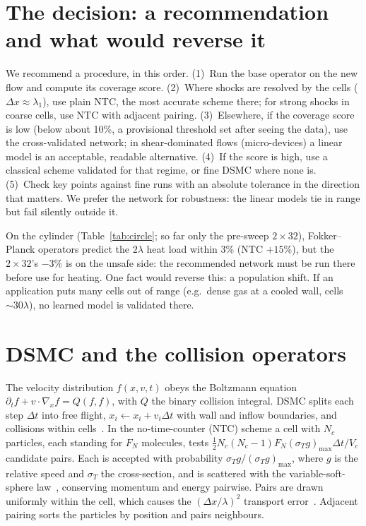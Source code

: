 \documentclass[10pt]{article}
\newcommand{\dx}{\Delta x}
\begin{document}
\section{The decision: a recommendation and what would reverse it}\label{sec:decision}

We recommend a procedure, in this order. (1)~Run the base operator on the new flow and compute
its coverage score. (2)~Where shocks are resolved by the cells
($\dx\approx\lambda_1$), use plain NTC, the most accurate scheme there; for strong shocks in
coarse cells, use NTC with adjacent pairing. (3)~Elsewhere, if the coverage score is low (below
about 10\%, a provisional threshold set after seeing the data), use the cross-validated network;
in shear-dominated flows (micro-devices) a linear model is an acceptable, readable alternative.
(4)~If the score is high, use a classical scheme validated for that regime, or fine DSMC where
none is. (5)~Check key points against fine runs with an absolute tolerance in the direction that
matters. We prefer the network for robustness: the linear models tie in range but fail silently outside it.

On the cylinder (Table~\ref{tab:circle}; so far only the pre-sweep $2\times32$), Fokker--Planck
operators predict the $2\lambda$ heat load within 3\% (NTC $+15\%$), but the $2\times32$'s $-3\%$
is on the unsafe side: the recommended network must be run there before use for heating. One fact would reverse this: a population shift. If an application puts many cells out of range
(e.g.\ dense gas at a cooled wall, cells $\sim30\lambda$), no learned model is validated there.




\clearpage
\appendix

\section{DSMC and the collision operators}\label{app:dsmc}

The velocity distribution $f(x,v,t)$ obeys the Boltzmann equation
$\partial_tf+v\cdot\nabla_xf=Q(f,f)$, with $Q$ the binary collision integral. DSMC splits each
step $\Delta t$ into free flight, $x_i\leftarrow x_i+v_i\Delta t$ with wall and inflow
boundaries, and collisions within cells~\citep{bird1994}. In the no-time-counter (NTC) scheme a
cell with $N_c$ particles, each standing for $F_N$ molecules, tests
$\tfrac12N_c(N_c-1)F_N(\sigma_Tg)_\mathrm{max}\Delta t/V_c$ candidate pairs. Each is accepted
with probability $\sigma_Tg/(\sigma_Tg)_\mathrm{max}$, where $g$ is the relative speed and
$\sigma_T$ the cross-section, and is scattered with the variable-soft-sphere law~\citep{koura1991},
conserving momentum and energy pairwise. Pairs are drawn uniformly within the cell, which causes
the $(\dx/\lambda)^2$ transport error~\citep{alexander1998}. Adjacent pairing sorts the particles
by position and pairs neighbours.
\end{document}
